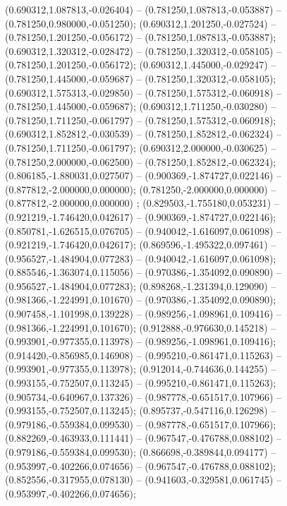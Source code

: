  (0.690312,1.087813,-0.026404) -- (0.781250,1.087813,-0.053887) -- (0.781250,0.980000,-0.051250);
 (0.690312,1.201250,-0.027524) -- (0.781250,1.201250,-0.056172) -- (0.781250,1.087813,-0.053887);
 (0.690312,1.320312,-0.028472) -- (0.781250,1.320312,-0.058105) -- (0.781250,1.201250,-0.056172);
 (0.690312,1.445000,-0.029247) -- (0.781250,1.445000,-0.059687) -- (0.781250,1.320312,-0.058105);
 (0.690312,1.575313,-0.029850) -- (0.781250,1.575312,-0.060918) -- (0.781250,1.445000,-0.059687);
 (0.690312,1.711250,-0.030280) -- (0.781250,1.711250,-0.061797) -- (0.781250,1.575312,-0.060918);
 (0.690312,1.852812,-0.030539) -- (0.781250,1.852812,-0.062324) -- (0.781250,1.711250,-0.061797);
 (0.690312,2.000000,-0.030625) -- (0.781250,2.000000,-0.062500) -- (0.781250,1.852812,-0.062324);
 (0.806185,-1.880031,0.027507) -- (0.900369,-1.874727,0.022146) -- (0.877812,-2.000000,0.000000);
 (0.781250,-2.000000,0.000000) -- (0.877812,-2.000000,0.000000) ;
 (0.829503,-1.755180,0.053231) -- (0.921219,-1.746420,0.042617) -- (0.900369,-1.874727,0.022146);
 (0.850781,-1.626515,0.076705) -- (0.940042,-1.616097,0.061098) -- (0.921219,-1.746420,0.042617);
 (0.869596,-1.495322,0.097461) -- (0.956527,-1.484904,0.077283) -- (0.940042,-1.616097,0.061098);
 (0.885546,-1.363074,0.115056) -- (0.970386,-1.354092,0.090890) -- (0.956527,-1.484904,0.077283);
 (0.898268,-1.231394,0.129090) -- (0.981366,-1.224991,0.101670) -- (0.970386,-1.354092,0.090890);
 (0.907458,-1.101998,0.139228) -- (0.989256,-1.098961,0.109416) -- (0.981366,-1.224991,0.101670);
 (0.912888,-0.976630,0.145218) -- (0.993901,-0.977355,0.113978) -- (0.989256,-1.098961,0.109416);
 (0.914420,-0.856985,0.146908) -- (0.995210,-0.861471,0.115263) -- (0.993901,-0.977355,0.113978);
 (0.912014,-0.744636,0.144255) -- (0.993155,-0.752507,0.113245) -- (0.995210,-0.861471,0.115263);
 (0.905734,-0.640967,0.137326) -- (0.987778,-0.651517,0.107966) -- (0.993155,-0.752507,0.113245);
 (0.895737,-0.547116,0.126298) -- (0.979186,-0.559384,0.099530) -- (0.987778,-0.651517,0.107966);
 (0.882269,-0.463933,0.111441) -- (0.967547,-0.476788,0.088102) -- (0.979186,-0.559384,0.099530);
 (0.866698,-0.389844,0.094177) -- (0.953997,-0.402266,0.074656) -- (0.967547,-0.476788,0.088102);
 (0.852556,-0.317955,0.078130) -- (0.941603,-0.329581,0.061745) -- (0.953997,-0.402266,0.074656);
